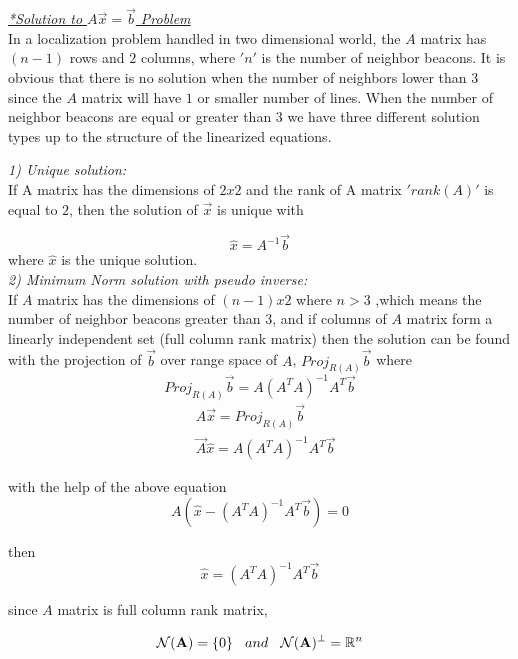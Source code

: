\documentclass[twoside]{article}
\begin{document}
\underline {\textit{*Solution to $A\vec{x} = \vec{b}$ Problem}}\\
In a localization problem handled in two dimensional world, the $A$ matrix has $(n-1)$ rows and $2$ columns, where $'n'$ is the number of neighbor beacons. It is obvious that there is no solution when the number of neighbors lower than $3$ since the $A$ matrix will have $1$ or smaller number of lines. When the number of neighbor beacons are equal or greater than $3$
we have three different solution types up to the structure of the linearized equations. 

\textit{1) Unique solution:}\\
 If A matrix has the dimensions of $2x2$ and the rank of A matrix $'rank(A)'$ is equal to $2$, then the solution of $\vec{x}$ is unique with

\begin{equation}
  \hat{x} = A^{-1}\vec{b}
\end{equation}
  where $\hat{x}$ is the unique solution. \\
  
  
\textit{ 2) Minimum Norm solution with pseudo inverse:} \\  
  If $A$ matrix has the dimensions of $(n-1)x2$ where $n>3$ ,which means the number of neighbor beacons greater than $3$, and if columns of $A$ matrix form a linearly independent set (full column rank matrix) then the solution can be found with the projection of $\vec{b}$ over range space of $A$, $Proj_{R(A)}\vec{b}$ where
  \begin{equation}
  Proj_{R(A)}\vec{b} = A (A^TA)^{-1}A^T\vec{b}
  \end{equation}
  \begin{align*}
  & A\vec{x} = Proj_{R(A)}\vec{b}\\
  & \vec{A}\hat{x} = A(A^TA)^{-1}A^T\vec{b}
  \end{align*}
 
with the help of the above equation
\begin{equation}
  A(\hat{x} - (A^TA)^{-1}A^T\vec{b}) = 0
\end{equation}

then 
\begin{equation}
 \hat{x} = (A^TA)^{-1}A^T\vec{b}
\end{equation}
  
  since $A$ matrix is full column rank matrix,
  
  \begin{align*}
\mathcal{N}(\mathbf{A}) = \{0\} \hspace{0.3cm}  and  \hspace{0.3cm}  \mathcal{N}(\mathbf{A})^\perp =\mathbb{R} ^n 
  \end{align*}
  
\end{document}
